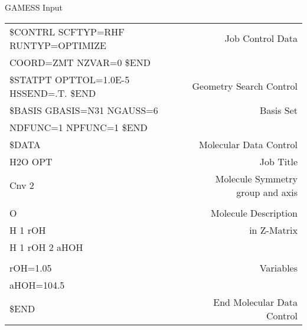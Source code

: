 \documentclass[slidestop,mathserif,compress,xcolor=svgnames]{beamer}
\begin{document}
\begin{frame}
  \begin{columns}
    \column{11cm}
    \begin{exampleblock}{GAMESS Input}
      {\scriptsize
      \begin{tabular}{lr}
	\$CONTRL SCFTYP=RHF RUNTYP=OPTIMIZE       & {\color{red}Job Control Data} \\
	\quad COORD=ZMT NZVAR=0 \$END             & {\color{red}} \\
	\$STATPT OPTTOL=1.0E-5 HSSEND=.T. \$END   & {\color{red}Geometry Search Control} \\
	\$BASIS GBASIS=N31 NGAUSS=6               & {\color{red}Basis Set} \\
	\quad NDFUNC=1 NPFUNC=1 \$END             & {\color{red}} \\
	\$DATA                                    & {\color{red}Molecular Data Control} \\
	H2O OPT                                   & {\color{red}Job Title} \\
	Cnv 2                                     & {\color{red}Molecule Symmetry group and axis} \\
						  & {\color{red}} \\
	O                                         & {\color{red}Molecule Description} \\
	H 1 rOH                                   & {\color{red}in Z-Matrix} \\
	H 1 rOH 2 aHOH                            & {\color{red}} \\
						  & {\color{red}} \\
	rOH=1.05                                  & {\color{red}Variables} \\
	aHOH=104.5                                & {\color{red}} \\
	\$END                                     & {\color{red}End Molecular Data Control} \\
      \end{tabular}
      }
    \end{exampleblock}
  \end{columns}
\end{frame}
\end{document}
